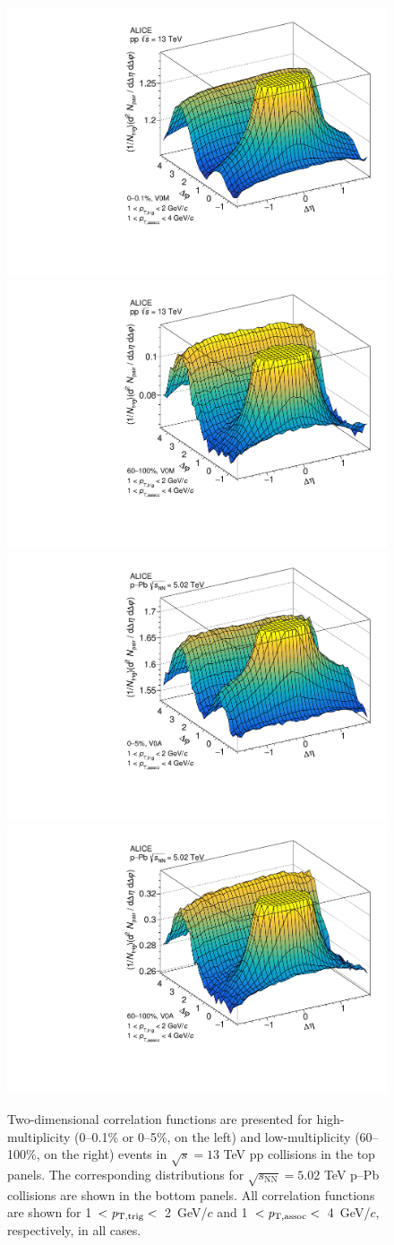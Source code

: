 \begin{figure}[h!]
		\includegraphics[width=0.5 \textwidth]{figures/FIG1_ppHigh.pdf} 
		\includegraphics[width=0.5 \textwidth]{figures/FIG1_ppLow.pdf} 
  		\includegraphics[width=0.5 \textwidth]{figures/FIG1_pPbHigh.pdf}
		\includegraphics[width=0.5 \textwidth]{figures/FIG1_pPbLow.pdf}
\caption{Two-dimensional correlation functions are presented for high-multiplicity (0--0.1\% or 0--5\%, on the left) and low-multiplicity (60--100\%, on the right) events in $\sqrt{s}=13$ TeV pp collisions in the top panels. The corresponding distributions for $\sqrt{s_{\mathrm{NN}}}=5.02$ TeV p--Pb collisions are shown in the bottom panels. All correlation functions are shown for 1~$<\it{p}_{\rm{T,trig}}<$~2~GeV/$c$ and 1~$<\it{p}_{\rm{T,assoc}}<$~4~GeV/$c$, respectively, in all cases.}
\label{fig:doubleridge}
\end{figure}

